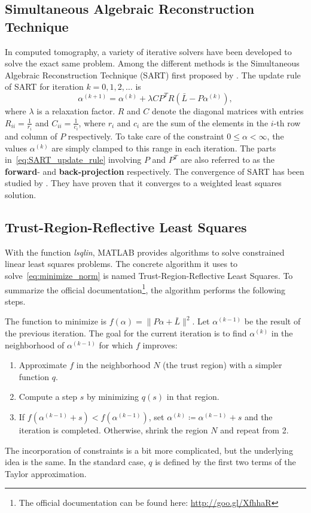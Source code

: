 \subsection*{Simultaneous Algebraic Reconstruction Technique}
In computed tomography, a variety of iterative solvers have been developed to solve the exact same problem. 
Among the different methods is the Simultaneous Algebraic Reconstruction Technique (\mbox{SART}) first proposed by \cite{SART}.
The update rule of \mbox{SART} for iteration $k = 0, 1, 2, \dots$ is
\begin{equation}\label{eq:SART_update_rule}
	\alpha^{(k + 1)} = \alpha^{(k)} + \lambda C P^T R \left( \bar{L} - P \alpha^{(k)} \right), 	
\end{equation}
where $\lambda$ is a relaxation factor.
$R$ and $C$ denote the diagonal matrices with entries $R_{ii} = \frac{1}{r_i}$ and $C_{ii} = \frac{1}{c_i}$, where $r_i$ and $c_i$ are the sum of the elements in the \mbox{$i$-th} row and column of $P$ respectively.
To take care of the constraint $0 \leq \alpha < \infty$, the values $\alpha^{(k)}$ are simply clamped to this range in each iteration.
The parts in~\ref{eq:SART_update_rule} involving $P$ and $P^T$ are also referred to as the \textbf{forward}- and \textbf{back-projection} respectively.
The convergence of \mbox{SART} has been studied by \cite{ConvergenceSART2}.
They have proven that it converges to a weighted least squares solution.

\subsection*{Trust-Region-Reflective Least Squares}
With the function \emph{lsqlin}, \mbox{MATLAB} provides algorithms to solve constrained linear least squares problems. 
The concrete algorithm it uses to solve~\ref{eq:minimize_norm} is named Trust-Region-Reflective Least Squares.
To summarize the official documentation\footnote{The official documentation can be found here: \url{http://goo.gl/XfhhaR}}, 
the algorithm performs the following steps.

The function to minimize is $f(\alpha) = \lVert P \alpha + \bar{L} \rVert^2$.
Let $\alpha^{(k - 1)}$ be the result of the previous iteration.
The goal for the current iteration is to find $\alpha^{(k)}$ in the neighborhood of $\alpha^{(k - 1)}$ for which $f$ improves:
\begin{enumerate}
	\item 	Approximate $f$ in the neighborhood $N$ (the trust region) with a simpler function $q$.
	\item 	Compute a step $s$ by minimizing $q(s)$ in that region.
	\item 	If $f(\alpha^{(k - 1)} + s) < f(\alpha^{(k - 1)})$, set $\alpha^{(k)} \coloneqq \alpha^{(k - 1)} + s$ and the iteration is completed.
	Otherwise, shrink the region $N$ and repeat from 2.
\end{enumerate}
The incorporation of constraints is a bit more complicated, but the underlying idea is the same.
In the standard case, $q$ is defined by the first two terms of the Taylor approximation.